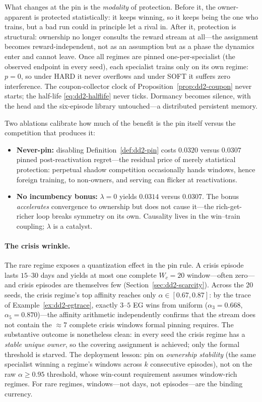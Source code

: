 What changes at the pin is the \emph{modality} of protection. Before it, the
owner-apparent is protected statistically: it keeps winning, so it keeps
being the one who trains, but a bad run could in principle let a rival in.
After it, protection is structural: ownership no longer consults the reward
stream at all---the assignment becomes reward-independent, not as an
assumption but as a phase the dynamics enter and cannot leave. Once all
regimes are pinned one-per-specialist (the observed endpoint in every seed),
each specialist trains only on its own regime: $p = 0$, so under HARD it
never overflows and under SOFT it suffers zero interference. The
coupon-collector clock of Proposition~\ref{prop:dd2-coupon} never starts; the
half-life \eqref{eq:dd2-halflife} never ticks. Dormancy becomes silence, with
the head and the six-episode library untouched---a distributed persistent
memory.

Two ablations calibrate how much of the benefit is the pin itself versus the
competition that produces it:
\begin{itemize}
  \item \textbf{Never-pin:} disabling Definition~\ref{def:dd2-pin} costs
        $0.0320$ versus $0.0307$ pinned post-reactivation regret---the
        residual price of merely statistical protection: perpetual shadow
        competition occasionally hands windows, hence foreign training, to
        non-owners, and serving can flicker at reactivations.
  \item \textbf{No incumbency bonus:} $\lambda = 0$ yields $0.0314$ versus
        $0.0307$. The bonus \emph{accelerates} convergence to ownership but
        does not cause it---the rich-get-richer loop breaks symmetry on its
        own. Causality lives in the win--train coupling; $\lambda$ is a
        catalyst.
\end{itemize}

\paragraph{The crisis wrinkle.}
The rare regime exposes a quantization effect in the pin rule. A crisis
episode lasts $15$--$30$ days and yields at most one complete $W_c = 20$
window---often zero---and crisis episodes are themselves few
(Section~\ref{sec:dd2-scarcity}). Across the 20 seeds, the crisis regime's
top affinity reaches only $\alpha \in [0.67, 0.87]$: by the trace of
Example~\ref{ex:dd2-egtrace}, exactly $3$--$5$ EG wins from uniform
($\alpha_3 = 0.668$, $\alpha_5 = 0.870$)---the affinity arithmetic
independently confirms that the stream does not contain the $\approx 7$
complete crisis windows formal pinning requires. The substantive outcome is
nonetheless clean: in every seed the crisis regime has a \emph{stable unique
owner}, so the covering assignment is achieved; only the formal threshold is
starved. The deployment lesson: pin on \emph{ownership stability} (the same
specialist winning a regime's windows across $k$ consecutive episodes), not
on the raw $\alpha \ge 0.95$ threshold, whose win-count requirement assumes
window-rich regimes. For rare regimes, windows---not days, not
episodes---are the binding currency.

